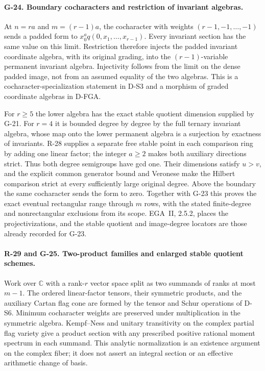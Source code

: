\paragraph{G-24. Boundary cocharacters and restriction of invariant algebras.}
At $n=ra$ and $m=(r-1)a$, the cocharacter with weights
$(r-1,-1,\ldots,-1)$ sends a padded form to
$x_0^a q(0,x_1,\ldots,x_{r-1})$. Every invariant section
has the same value on this limit. Restriction therefore
injects the padded invariant coordinate algebra, with its
original grading, into the $(r-1)$-variable permanent
invariant algebra. Injectivity follows from the limit on
the dense padded image, not from an assumed equality of
the two algebras. This is a cocharacter-specialization
statement in D-S3 and a morphism of graded coordinate
algebras in D-FGA.

For $r\ge5$ the lower algebra has the exact stable quotient
dimension supplied by G-21. For $r=4$ it is bounded degree
by degree by the full ternary invariant algebra, whose map
onto the lower permanent algebra is a surjection by
exactness of invariants. R-28 supplies a separate free
stable point in each comparison ring by adding one linear
factor; the integer $a\ge2$ makes both auxiliary directions
strict. Thus both degree semigroups have gcd one. Their
dimensions satisfy $u>v$, and the explicit common generator
bound and Veronese make the Hilbert comparison strict at
every sufficiently large original degree. Above the
boundary the same cocharacter sends the form to zero.
Together with G-23 this proves the exact eventual rectangular
range through $m$ rows, with the stated finite-degree and
nonrectangular exclusions from its scope. EGA~II, 2.5.2,
places the projectivizations, and the stable quotient and
image-degree locators are those already recorded for G-23.


\paragraph{R-29 and G-25. Two-product families and enlarged stable quotient schemes.}
Work over $\mathbb C$ with a rank-$r$ vector space split as two
summands of ranks at most $m-1$. The ordered linear-factor tensors,
their symmetric products, and the auxiliary Cartan flag cone are
formed by the tensor and Schur operations of D-S6. Minimum
cocharacter weights are preserved under multiplication in the
symmetric algebra. Kempf--Ness and unitary transitivity on the
complex partial flag variety give a product section with any
prescribed positive rational moment spectrum in each summand.
This analytic normalization is an existence argument on the
complex fiber; it does not assert an integral section or an
effective arithmetic change of basis.

